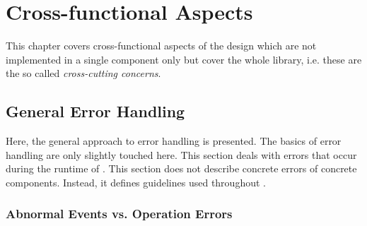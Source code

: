 
\chapter{Cross-functional Aspects}
\label{sec:BasicAspects}

This chapter covers cross-functional aspects of the \LibName{} design which are not implemented in a single component only but cover the whole library, i.e. these are the so called \emph{cross-cutting concerns}.


\section{General Error Handling}
\label{sec:GeneralErrorHandling}

Here, the general approach to error handling is presented. The basics of error handling are only slightly touched here. This section deals with errors that occur during the runtime of \LibName{}. This section does not describe concrete errors of concrete \LibName{} components. Instead, it defines guidelines used throughout \LibName{}.


\subsection{Abnormal Events vs. Operation Errors}
\label{sec:AbnormalEvengtVsOperationErrors}

